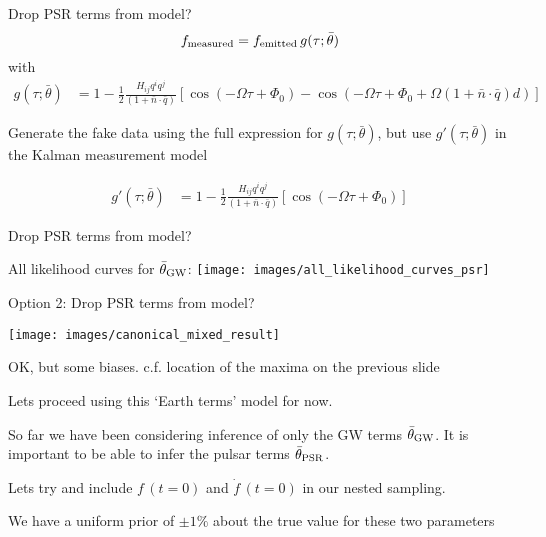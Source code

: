 \documentclass[10pt]{beamer}
\begin{document}
\begin{frame}{Drop PSR terms from model?}
	 \begin{equation}
		f_{\rm measured} = f_{\rm emitted} \, g(\tau; \bar{\theta})
		\label{eq:measureent}
	\end{equation}
	with
	\begin{align}
		g(\tau; \bar{\theta}) 
		& = 1 - \frac{1}{2} \frac{ H_{ij}q^i q^j }{(1 + \bar{n}\cdot \bar{q}) } \left[ \cos(-\Omega \tau +\Phi_0) - \cos(-\Omega \tau +\Phi_0 + \Omega (1 + \bar{n}\cdot \bar{q})  d) \right]
	\end{align}

Generate the fake data using the full expression for $g(\tau; \bar{\theta})$, but use $g'(\tau; \bar{\theta})$ in the Kalman measurement model
	
		\begin{align}
		g'(\tau; \bar{\theta}) 
		& = 1 - \frac{1}{2} \frac{ H_{ij}q^i q^j }{(1 + \bar{n}\cdot \bar{q}) } \left[ \cos(-\Omega \tau +\Phi_0) \right]
	\end{align}
\end{frame}


\begin{frame}{Drop PSR terms from model?}
	
		All likelihood curves for $\bar{\theta}_{\rm GW}$:
		\texttt{[image: images/all\_likelihood\_curves\_psr]}

\end{frame}


\begin{frame}{Option 2: Drop PSR terms from model?}
	
	
	\texttt{[image: images/canonical\_mixed\_result]}
	
	OK, but some biases. c.f. location of the maxima on the previous slide
\end{frame}



\begin{frame}{}
	
	Lets proceed using this `Earth terms' model for now. 
	
	
   So far we have been considering inference of only the GW terms $\bar{\theta}_{\rm GW}$. It is important to be able to infer the pulsar terms $\bar{\theta}_{\rm PSR}$.
   
   
   Lets try and include $f \, (t=0)$ and $\dot{f} \, (t=0)$ in our nested sampling.
   
   We have a uniform prior of $\pm 1 \%$ about the true value for these two parameters 
	
	
	

	

\end{frame}
\end{document}
